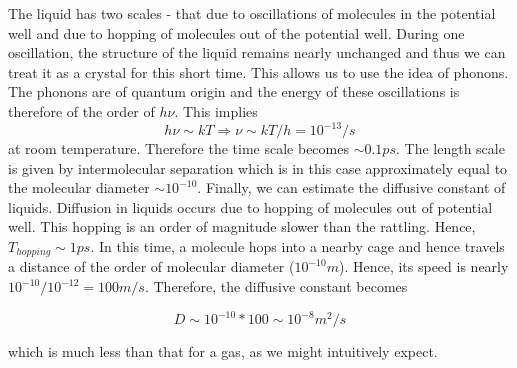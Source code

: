 \documentclass[11pt, letterpaper]{article}
\begin{document}
The liquid has two scales - that due to oscillations of molecules in the potential well and due to hopping of molecules out of the potential well. During one oscillation, the structure of the liquid remains nearly unchanged and thus we can treat it as a crystal for this short time. This allows us to use the idea of phonons. The phonons are of quantum origin and the energy of these oscillations is therefore of the order of $h\nu$. This implies
$$
h \nu \sim kT \Rightarrow \nu \sim kT/h = 10^{-13} /s
$$
at room temperature. Therefore the time scale becomes $\sim 0.1 ps$. The length scale is given by intermolecular separation which is in this case approximately equal to the molecular diameter $\sim 10^{-10}$. Finally, we can estimate the diffusive constant of liquids. Diffusion in liquids occurs due to hopping of molecules out of potential well. This hopping is an order of magnitude slower than the rattling. Hence, $T_{hopping}\sim 1ps$. In this time, a molecule hops into a nearby cage and hence travels a distance of the order of molecular diameter ($10^{-10}m$). Hence, its speed is nearly $10^{-10}/10^{-12} = 100m/s$. Therefore, the diffusive constant becomes

$$
D \sim 10^{-10}*100 \sim 10^{-8}m^2/s
$$

which is much less than that for a gas, as we might intuitively expect.
\end{document}
